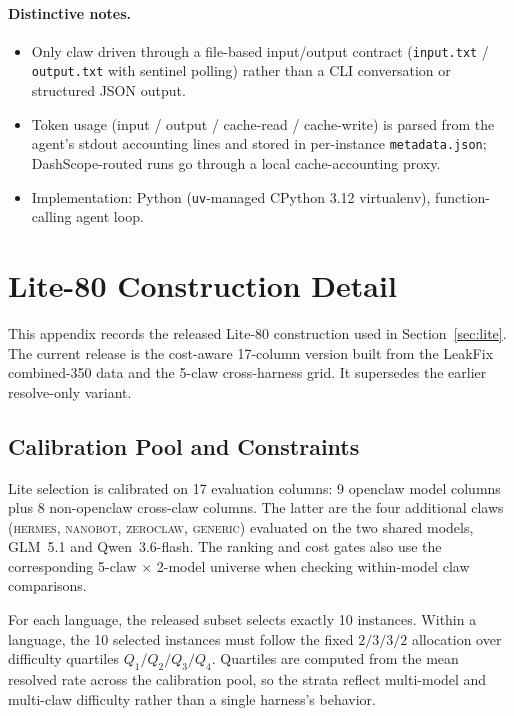 \documentclass{llmxive}
\begin{document}
\paragraph{Distinctive notes.}
\begin{itemize}
  \item Only claw driven through a file-based input/output contract
  (\texttt{input.txt} / \texttt{output.txt} with sentinel polling) rather than
  a CLI conversation or structured JSON output.
  \item Token usage (input / output / cache-read / cache-write) is parsed from
  the agent's stdout accounting lines and stored in per-instance
  \texttt{metadata.json}; DashScope-routed runs go through a local
  cache-accounting proxy.
  \item Implementation: Python (\texttt{uv}-managed CPython 3.12 virtualenv),
  function-calling agent loop.
\end{itemize}

\section{Lite-80 Construction Detail}\label{appendix:lite}

This appendix records the released Lite-80 construction used in
Section~\ref{sec:lite}.  The current release is the cost-aware
17-column version built from the LeakFix combined-350 data and the
5-claw cross-harness grid.  It supersedes the earlier resolve-only
variant.

\subsection{Calibration Pool and Constraints}

Lite selection is calibrated on 17 evaluation columns: 9 openclaw model
columns plus 8 non-openclaw cross-claw columns.  The latter are the four
additional claws (\textsc{hermes}, \textsc{nanobot}, \textsc{zeroclaw},
\textsc{generic}) evaluated on the two shared models, GLM~5.1 and
Qwen~3.6-flash.  The ranking and cost gates also use the corresponding
5-claw $\times$ 2-model universe when checking within-model claw
comparisons.

For each language, the released subset selects exactly 10 instances.
Within a language, the 10 selected instances must follow the fixed
$2/3/3/2$ allocation over difficulty quartiles $Q_1/Q_2/Q_3/Q_4$.
Quartiles are computed from the mean resolved rate across the
calibration pool, so the strata reflect multi-model and multi-claw
difficulty rather than a single harness's behavior.
\end{document}
